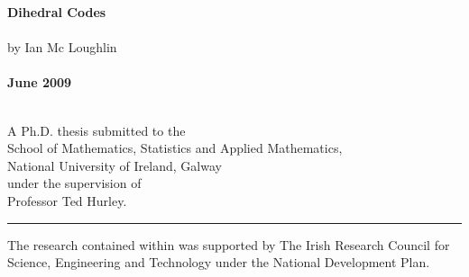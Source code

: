 \begin{titlepage}
\singlespace

\begin{center}
\Huge  \textbf{Dihedral Codes} \\
\normalsize \ \\
\normalsize{by} {\Large Ian Mc Loughlin}\\
\ \\[13cm]
\large \textbf{June 2009}\\
\end{center}
\ \\[2cm]
{\scriptsize A Ph.D. thesis submitted to the}\\[0.9mm]
{School of Mathematics, Statistics and Applied Mathematics,\\[0.2mm]
National University of Ireland, Galway}\\[1mm]
{\scriptsize under the supervision of}\\[0.3mm]
Professor Ted Hurley.\\[0.2mm]
\rule{13cm}{1pt}
{\scriptsize \begin{spacing}{1} \noindent The research contained within was supported by The Irish Research Council for Science, Engineering and Technology under the National Development Plan.\end{spacing}}
\end{titlepage}
